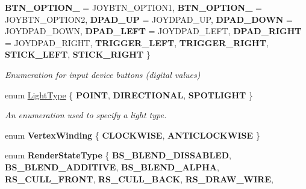 \begin{DoxyCompactItemize}
{\bfseries B\+T\+N\+\_\+\+O\+P\+T\+I\+O\+N\+\_} = J\+O\+Y\+B\+T\+N\+\_\+\+O\+P\+T\+I\+O\+N1, 
{\bfseries B\+T\+N\+\_\+\+O\+P\+T\+I\+O\+N\+\_} = J\+O\+Y\+B\+T\+N\+\_\+\+O\+P\+T\+I\+O\+N2, 
{\bfseries D\+P\+A\+D\+\_\+\+UP} = J\+O\+Y\+D\+P\+A\+D\+\_\+\+UP, 
{\bfseries D\+P\+A\+D\+\_\+\+D\+O\+WN} = J\+O\+Y\+D\+P\+A\+D\+\_\+\+D\+O\+WN, 
\newline
{\bfseries D\+P\+A\+D\+\_\+\+L\+E\+FT} = J\+O\+Y\+D\+P\+A\+D\+\_\+\+L\+E\+FT, 
{\bfseries D\+P\+A\+D\+\_\+\+R\+I\+G\+HT} = J\+O\+Y\+D\+P\+A\+D\+\_\+\+R\+I\+G\+HT, 
{\bfseries T\+R\+I\+G\+G\+E\+R\+\_\+\+L\+E\+FT}, 
{\bfseries T\+R\+I\+G\+G\+E\+R\+\_\+\+R\+I\+G\+HT}, 
\newline
{\bfseries S\+T\+I\+C\+K\+\_\+\+L\+E\+FT}, 
{\bfseries S\+T\+I\+C\+K\+\_\+\+R\+I\+G\+HT}
 \}\begin{DoxyCompactList}\small\item\em Enumeration for input device buttons (digital values) \end{DoxyCompactList}
\item 
\mbox{\label{namespace_blade_ab0c52aa137a4f43360f7440da56e6b03}} 
enum \hyperlink{namespace_blade_ab0c52aa137a4f43360f7440da56e6b03}{Light\+Type} \{ {\bfseries P\+O\+I\+NT}, 
{\bfseries D\+I\+R\+E\+C\+T\+I\+O\+N\+AL}, 
{\bfseries S\+P\+O\+T\+L\+I\+G\+HT}
 \}\begin{DoxyCompactList}\small\item\em An enumeration used to specify a light type. \end{DoxyCompactList}
\item 
\mbox{\label{namespace_blade_a4b6ac7802a4412b5138fa77c1e0533e9}} 
enum {\bfseries Vertex\+Winding} \{ {\bfseries C\+L\+O\+C\+K\+W\+I\+SE}, 
{\bfseries A\+N\+T\+I\+C\+L\+O\+C\+K\+W\+I\+SE}
 \}
\item 
\mbox{\label{namespace_blade_ac5f389178b43481cf98bcb4e6740c2c8}} 
enum {\bfseries Render\+State\+Type} \{ \newline
{\bfseries B\+S\+\_\+\+B\+L\+E\+N\+D\+\_\+\+D\+I\+S\+S\+A\+B\+L\+ED}, 
{\bfseries B\+S\+\_\+\+B\+L\+E\+N\+D\+\_\+\+A\+D\+D\+I\+T\+I\+VE}, 
{\bfseries B\+S\+\_\+\+B\+L\+E\+N\+D\+\_\+\+A\+L\+P\+HA}, 
{\bfseries R\+S\+\_\+\+C\+U\+L\+L\+\_\+\+F\+R\+O\+NT}, 
\newline
{\bfseries R\+S\+\_\+\+C\+U\+L\+L\+\_\+\+B\+A\+CK}, 
{\bfseries R\+S\+\_\+\+D\+R\+A\+W\+\_\+\+W\+I\+RE}, 

\end{DoxyCompactItemize}
